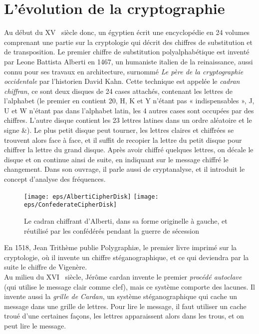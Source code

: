 \section{L'évolution de la cryptographie}
Au début du XV\ieme~ siècle donc, un égyptien écrit une encyclopédie en
24 volumes comprenant une partie sur la cryptologie qui décrit des
chiffres de substitution et de transposition. Le premier chiffre de
substitution polyalphabétique
est inventé par Leone Battista Alberti en 1467, un humaniste italien
de la reinaissance, aussi connu pour ses travaux en architecture,
surnommé \emph{Le père de la cryptographie occidentale} par
l'historien David Kahn\cite{Codebreakers}. Cette technique est appelée
le \emph{cadran chiffran}\label{syst:cadranchiffran}, ce sont deux
disques de 24 cases attachés, contenant les lettres de l'alphabet (le
premier en contient 20, H, K et Y n'étant pas « indispensables », J, U
et W n'étant pas dans l'alphabet latin, les 4 autres cases sont
occupées par des chiffres. L'autre disque contient les 23 lettres
latines dans un ordre aléatoire et le signe \&). Le plus petit disque
peut tourner, les lettres claires et chiffrées se trouvent alors face
à face, et il suffit de recopier la lettre du petit disque pour
chiffrer la lettre du grand disque. Après avoir chiffré quelques
lettres, on décale le disque et on continue ainsi de suite, en
indiquant sur le message chiffré le changement. Dans son ouvrage, il
parle aussi de cryptanalyse, et il introduit le concept d'analyse des 
fréquences. \\

\begin{figure}[h]
  \begin{center}
    \texttt{[image: eps/AlbertiCipherDisk]}
    \hspace{3cm}
    \texttt{[image: eps/ConfederateCipherDisk]}
  \end{center}
  \caption{Le cadran chiffrant d'Alberti, dans sa forme originelle à
    gauche, et réutilisé par les confédérés pendant la guerre de
    sécession}
  \label{fig:AlbertiCadranChiffrant}
\end{figure}

En 1518, Jean Trithème publie Polygraphi\ae , le premier livre imprimé
sur la cryptologie, où il invente un chiffre stéganographique, et ce
qui deviendra par la suite le chiffre de
Vigenère. \\

Au milieu du XVI\ieme~ siècle, Jérôme cardan invente le premier
\emph{procédé autoclave} (qui utilise le message clair comme clef),
mais ce système comporte des lacunes. Il invente aussi la \emph{grille
  de Cardan}, un système stéganographique qui cache un message dans
une grille de lettres. Pour lire le message, il faut utiliser un cache
troué d'une certaines façons, les lettres apparaissent alors dans les
trous, et on peut lire le message. \\


